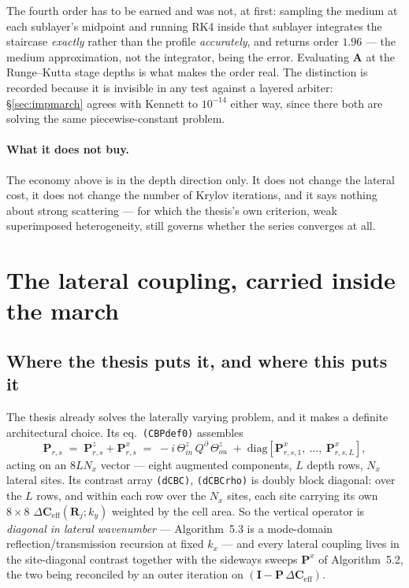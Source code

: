 \documentclass[11pt,a4paper]{article}
\newcommand{\bI}{\mathbf{I}}
\newcommand{\bA}{\mathbf{A}}
\newcommand{\bP}{\mathbf{P}}
\newcommand{\dCeff}{\Delta\mathbf{C}_{\mathrm{eff}}}
\begin{document}
The fourth order has to be earned and was not, at first: sampling the medium at
each sublayer's midpoint and running RK4 inside that sublayer integrates the
staircase \emph{exactly} rather than the profile \emph{accurately}, and returns
order $1.96$ --- the medium approximation, not the integrator, being the error.
Evaluating $\bA$ at the Runge--Kutta stage depths is what makes the order real.
The distinction is recorded because it is invisible in any test against a
layered arbiter: \S\ref{sec:impmarch} agrees with Kennett to $10^{-14}$ either
way, since there both are solving the same piecewise-constant problem.

\paragraph{What it does not buy.}  The economy above is in the depth direction
only.  It does not change the lateral cost, it does not change the number of
Krylov iterations, and it says nothing about strong scattering --- for which the
thesis's own criterion, weak superimposed heterogeneity, still governs whether
the series converges at all.

\section{The lateral coupling, carried inside the
march}\label{sec:imbedlateral}

\subsection{Where the thesis puts it, and where this puts it}

The thesis already solves the laterally varying problem, and it makes a
definite architectural choice.  Its eq.~\texttt{(CBPdef0)} assembles
\begin{equation}\label{eq:cbpdef}
  \bP_{r,s} \;=\; \bP^{z}_{r,s} + \bP^{x}_{r,s}
  \;=\; -i\,\Theta^{z}_{in}\,Q^{\partial}\,\Theta^{z}_{ou}
  \;+\; \mathrm{diag}\!\left[\bP^{x}_{r,s,1},\ \dots,\ \bP^{x}_{r,s,L}\right],
\end{equation}
acting on an $8LN_x$ vector --- eight augmented components, $L$ depth rows,
$N_x$ lateral sites.  Its contrast array \texttt{(dCBC)}, \texttt{(dCBCrho)} is
doubly block diagonal: over the $L$ rows, and within each row over the $N_x$
sites, each site carrying its own $8\times8$ $\dCeff(\mathbf{R}_j;k_y)$ weighted
by the cell area.  So the vertical operator is \emph{diagonal in lateral
wavenumber} --- Algorithm~5.3 is a mode-domain reflection/transmission recursion
at fixed $k_x$ --- and every lateral coupling lives in the site-diagonal
contrast together with the sideways sweeps $\bP^{x}$ of Algorithm~5.2, the two
being reconciled by an outer iteration on $(\bI - \bP\,\dCeff)$.
\end{document}
